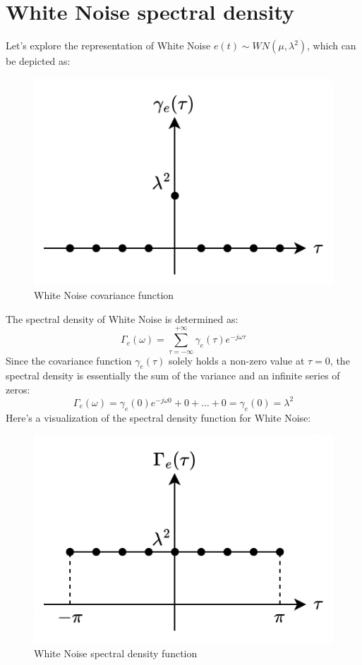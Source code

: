 \section{ White Noise spectral density}

Let's explore the representation of  White Noise $e(t) \sim WN (\mu,\lambda^2)$, which can be depicted as:
\begin{figure}[H]
    \centering
    \includegraphics[width=0.35\linewidth]{images/wn1.png}
    \caption{White Noise covariance function}
\end{figure}
\noindent The spectral density of  White Noise is determined as:
\[\Gamma_e(\omega)=\sum_{\tau=-\infty}^{+\infty}\gamma_e(\tau)e^{-j\omega\tau}\]
Since the covariance function $\gamma_e(\tau)$ solely holds a non-zero value at $\tau=0$, the spectral density is essentially the sum of the variance and an infinite series of zeros:
\[\Gamma_e(\omega)=\gamma_e(0)e^{-j\omega 0}+0+\dots+0=\gamma_e(0)=\lambda^2\]
Here's a visualization of the spectral density function for  White Noise:
\begin{figure}[H]
    \centering
    \includegraphics[width=0.35\linewidth]{images/wn2.png}
    \caption{ White Noise spectral density function}
\end{figure}